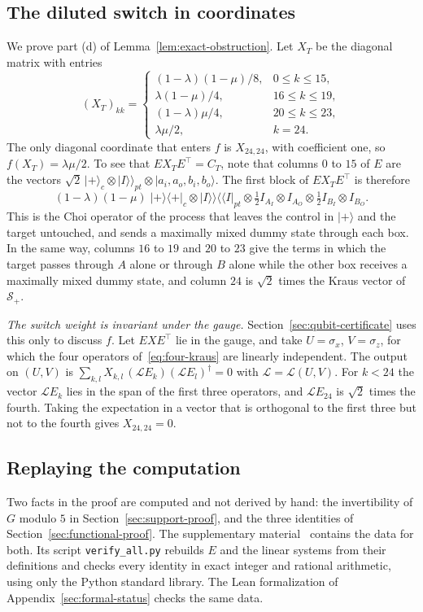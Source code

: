 \documentclass[11pt,letterpaper]{article}
\theoremstyle{definition}\newtheorem{definition}[theorem]{Definition}
\newcommand{\ket}[1]{\lvert#1\rangle}
\newcommand{\bra}[1]{\langle#1\rvert}
\newcommand{\proj}[1]{\ket{#1}\!\bra{#1}}
\newcommand{\vket}[1]{\lvert#1\rangle\!\rangle}
\newcommand{\vbra}[1]{\langle\!\langle#1\rvert}
\newcommand{\SW}{\mathcal S}
\begin{document}
\subsection{The diluted switch in coordinates}\label{sec:diluted-coordinates}

We prove part (d) of Lemma~\ref{lem:exact-obstruction}. Let $X_T$ be
the diagonal matrix with entries
\[
 (X_T)_{kk}=\begin{cases}
 (1-\lambda)(1-\mu)/8,&0\le k\le15,\\
 \lambda(1-\mu)/4,&16\le k\le19,\\
 (1-\lambda)\mu/4,&20\le k\le23,\\
 \lambda\mu/2,&k=24.
 \end{cases}
\]
The only diagonal coordinate that enters $f$ is $X_{24,24}$, with
coefficient one, so $f(X_T)=\lambda\mu/2$. To see that
$EX_TE^{\top}=C_T$, note that columns $0$ to $15$ of $E$ are the
vectors
$\sqrt2\,\ket+_c\otimes\vket I_{pt}\otimes\ket{a_i,a_o,b_i,b_o}$. The
first block of
$EX_TE^{\top}$ is therefore
\[
 (1-\lambda)(1-\mu)\;\proj+_c\otimes\vket I\vbra I_{pt}\otimes
 \tfrac12I_{A_I}\otimes I_{A_O}\otimes\tfrac12I_{B_I}\otimes I_{B_O}.
\]
This is the Choi operator of the process that leaves the control in
$\ket+$ and the target untouched, and sends a maximally mixed dummy
state through each box. In the same way, columns $16$ to $19$ and $20$
to $23$ give the terms in which the target passes through $A$ alone or
through $B$ alone while the other box receives a maximally mixed dummy
state, and column $24$ is $\sqrt2$ times the Kraus vector of $\SW_+$.

\emph{The switch weight is invariant under the gauge.}
Section~\ref{sec:qubit-certificate} uses this only to discuss $f$. Let
$EXE^{\top}$ lie in the gauge, and take $U=\sigma_x$, $V=\sigma_z$, for
which the four operators of~\eqref{eq:four-kraus} are linearly
independent. The output on $(U,V)$ is
$\sum_{k,l}X_{k,l}\,(\mathcal L E_k)(\mathcal L E_l)^\dagger=0$ with
$\mathcal L=\mathcal L(U,V)$. For $k<24$ the vector $\mathcal LE_k$ lies
in the span of the first three operators, and $\mathcal LE_{24}$ is
$\sqrt2$ times the fourth. Taking the expectation in a vector that is
orthogonal to the first three but not to the fourth gives
$X_{24,24}=0$.

\subsection{Replaying the computation}

Two facts in the proof are computed and not derived by
hand: the invertibility of $G$ modulo $5$ in
Section~\ref{sec:support-proof}, and the three identities of
Section~\ref{sec:functional-proof}. The supplementary
material~\cite{repo} contains the data for both. Its script
\texttt{verify\_all.py} rebuilds $E$ and the linear systems from their
definitions and checks every identity in exact integer and rational
arithmetic, using only the Python standard library. The Lean
formalization of Appendix~\ref{sec:formal-status} checks the same data.
\end{document}
